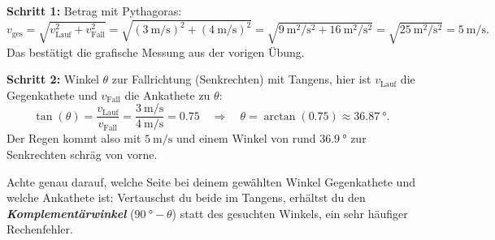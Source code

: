 \documentclass[addpoints,11pt,a4paper]{exam}
\begin{document}
\begin{theoriebox}
\textbf{Schritt 1:} Betrag mit Pythagoras:
\[
  v_{\text{ges}} = \sqrt{v_{\text{Lauf}}^2 + v_{\text{Fall}}^2} = \sqrt{(\SI{3}{\meter\per\second})^2 + (\SI{4}{\meter\per\second})^2} = \sqrt{\SI{9}{\meter\squared\per\second\squared}+\SI{16}{\meter\squared\per\second\squared}} = \sqrt{\SI{25}{\meter\squared\per\second\squared}} = \SI{5}{\meter\per\second}.
\]
Das bestätigt die grafische Messung aus der vorigen Übung.

\textbf{Schritt 2:} Winkel $\theta$ zur Fallrichtung (Senkrechten) mit
Tangens, hier ist $v_{\text{Lauf}}$ die Gegenkathete und $v_{\text{Fall}}$
die Ankathete zu $\theta$:
\[
  \tan(\theta) = \frac{v_{\text{Lauf}}}{v_{\text{Fall}}} = \frac{\SI{3}{\meter\per\second}}{\SI{4}{\meter\per\second}} = 0.75 \quad\Longrightarrow\quad \theta = \arctan(0.75) \approx \SI{36.87}{\degree}.
\]
Der Regen kommt also mit $\SI{5}{\meter\per\second}$ und einem Winkel von
rund $\SI{36.9}{\degree}$ zur Senkrechten schräg von vorne.

\begin{hinweisbox}
Achte genau darauf, welche Seite bei deinem gewählten Winkel Gegenkathete
und welche Ankathete ist: Vertauschst du beide im Tangens, erhältst du den
\textbf{\emph{Komplementärwinkel}} ($\SI{90}{\degree}-\theta$) statt des
gesuchten Winkels, ein sehr häufiger Rechenfehler.
\end{hinweisbox}
\end{theoriebox}
\end{document}
